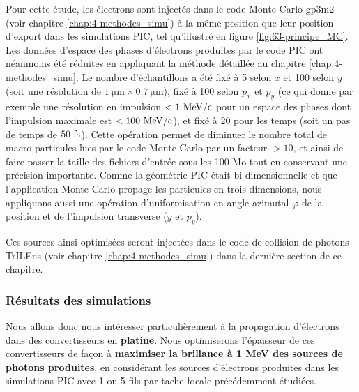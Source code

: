 \begin{refsection}
Pour cette étude, les électrons sont injectés dans le code Monte Carlo gp3m2 (voir chapitre \ref{chap:4-methodes_simu}) à la même position que leur position d'export dans les simulations PIC, tel qu'illustré en figure \ref{fig:63-principe_MC}. Les données d'espace des phases d'électrons produites par le code PIC ont néanmoins été réduites en appliquant la méthode détaillée au chapitre \ref{chap:4-methodes_simu}. Le nombre d'échantillons a été fixé à 5 selon $x$ et 100 selon $y$ (soit une résolution de $1 ~ \si{\um} \times 0.7 ~ \si{\um}$), fixé à 100 selon $p_x$ et $p_y$ (ce qui donne par exemple une résolution en impulsion $<1 ~ \rm MeV/c$ pour un espace des phases dont l'impulsion maximale est $<100 ~ \rm MeV/c$), et fixé à 20 pour les temps (soit un pas de temps de $50 ~ \rm fs$). Cette opération permet de diminuer le nombre total de macro-particules lues par le code Monte Carlo par un facteur $>10$, et ainsi de faire passer la taille des fichiers d'entrée sous les 100 Mo tout en conservant une précision importante. Comme la géométrie PIC était bi-dimensionnelle et que l'application Monte Carlo propage les particules en trois dimensions, nous appliquons aussi une opération d'uniformisation en angle azimutal $\varphi$ de la position et de l'impulsion transverse ($y$ et $p_y$). 


Ces sources ainsi optimisées seront injectées dans le code de collision de photons TrILEns (voir chapitre \ref{chap:4-methodes_simu}) dans la dernière section de ce chapitre.


\subsubsection{Résultats des simulations}

Nous allons donc nous intéresser particulièrement à la propagation d'électrons dans des convertisseurs en \textbf{platine}. Nous optimiserons l'épaisseur de ces convertisseurs de façon à \textbf{maximiser la brillance à 1 MeV des sources de photons produites}, en considérant les sources d'électrons produites dans les simulations PIC avec 1 ou 5 fils par tache focale précédemment étudiées. 



\end{refsection}
